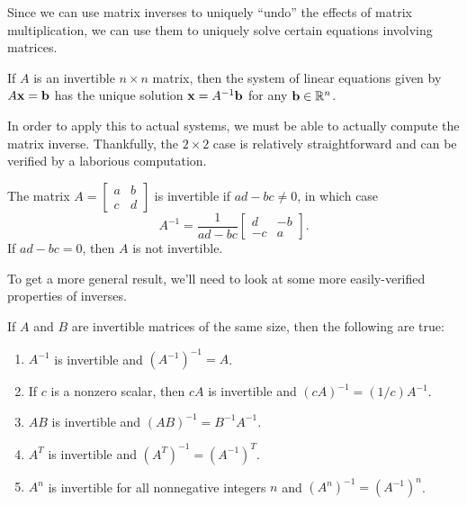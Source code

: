 \documentclass[../m073main.tex]{subfiles}
\begin{document}
Since we can use matrix inverses to uniquely ``undo'' the effects of matrix multiplication, we can use them to uniquely solve certain equations involving matrices.

\begin{theorem}
	If $A$ is an invertible $n\times n$ matrix, then the system of linear equations given by $A\mathbf{x} = \mathbf{b}$ has the unique solution $\mathbf{x} = A^{-1}\mathbf{b}$ for any $\mathbf{b}\in\mathbb{R}^n$.
\end{theorem}

In order to apply this to actual systems, we must be able to actually compute the matrix inverse.
Thankfully, the $2 \times 2$ case is relatively straightforward and can be verified by a laborious computation.


\begin{theorem}
	The matrix $A = \begin{bmatrix} a & b \\ c & d \end{bmatrix}$ is invertible if $ad - bc \neq 0$, in which case
	\[ A^{-1} = \frac{1}{ad-bc} \begin{bmatrix} d & -b \\ -c & a \end{bmatrix}. \]
	If $ad-bc = 0$, then $A$ is not invertible.
\end{theorem}

To get a more general result, we'll need to look at some more easily-verified properties of inverses.

\begin{theorem}
	If $A$ and $B$ are invertible matrices of the same size, then the following are true:
	\begin{enumerate}[label=(\alph*)]
		\item $A^{-1}$ is invertible and $(A^{-1})^{-1} = A$.
		\item If $c$ is a nonzero scalar, then $cA$ is invertible and $(cA)^{-1} = (1 / c) A^{-1}$.
		\item $AB$ is invertible and $(AB)^{-1} = B^{-1}A^{-1}$.
		\item $A^T$ is invertible and $(A^T)^{-1} = (A^{-1})^T$.
		\item $A^n$ is invertible for all nonnegative integers $n$ and $(A^n)^{-1} = (A^{-1})^n$.
	\end{enumerate}
\end{theorem}
\end{document}
